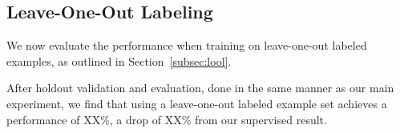 \subsection{Leave-One-Out Labeling}

We now evaluate the performance when training on leave-one-out labeled
examples, as outlined in Section~\ref{subsec:lool}.

After holdout validation and evaluation, done in the same manner as our main
experiment, we find that using a leave-one-out labeled example set achieves a
performance of XX\%, a drop of XX\% from our supervised result.
